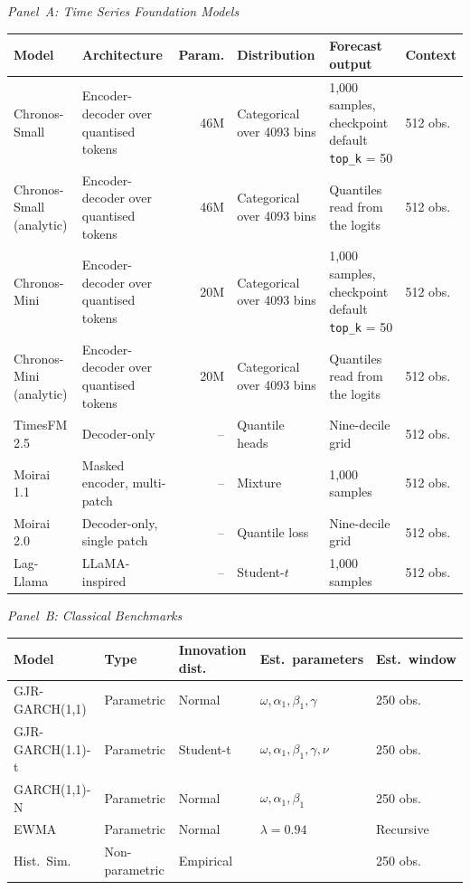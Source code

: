 \par\smallskip
\textit{Panel~A: Time Series Foundation Models}
\smallskip

\footnotesize
\begin{tabular}{@{}p{2.45cm}p{2.9cm}r p{2.5cm}p{3.2cm}l@{}}
\toprule
Model & Architecture & Param. & Distribution & Forecast output & Context \\
\midrule
Chronos-Small & Encoder-decoder over quantised tokens & 46M
& Categorical over 4093 bins & 1{,}000 samples{,} checkpoint default \texttt{top\_k} = 50
& 512 obs. \\
Chronos-Small (analytic) & Encoder-decoder over quantised tokens & 46M
& Categorical over 4093 bins & Quantiles read from the logits
& 512 obs. \\
Chronos-Mini & Encoder-decoder over quantised tokens & 20M
& Categorical over 4093 bins & 1{,}000 samples{,} checkpoint default \texttt{top\_k} = 50
& 512 obs. \\
Chronos-Mini (analytic) & Encoder-decoder over quantised tokens & 20M
& Categorical over 4093 bins & Quantiles read from the logits
& 512 obs. \\
TimesFM 2.5 & Decoder-only & --
& Quantile heads & Nine-decile grid
& 512 obs. \\
Moirai 1.1 & Masked encoder, multi-patch & --
& Mixture & 1{,}000 samples
& 512 obs. \\
Moirai 2.0 & Decoder-only, single patch & --
& Quantile loss & Nine-decile grid
& 512 obs. \\
Lag-Llama & LLaMA-inspired & --
& Student-$t$ & 1{,}000 samples
& 512 obs. \\
\bottomrule
\end{tabular}
\normalsize

\bigskip
\textit{Panel~B: Classical Benchmarks}
\smallskip

\footnotesize
\begin{tabular}{@{}p{3.0cm}p{2.2cm}p{2.2cm}p{4.0cm}l@{}}
\toprule
Model & Type & Innovation dist.\
& Est.\ parameters & Est.\ window \\
\midrule
GJR-GARCH(1,1) & Parametric & Normal
& $\omega,\alpha_1,\beta_1,\gamma$
& 250 obs. \\
GJR-GARCH(1.1)-t & Parametric & Student-t
& $\omega,\alpha_1,\beta_1,\gamma,\nu$
& 250 obs. \\
GARCH(1,1)-N & Parametric & Normal
& $\omega,\alpha_1,\beta_1$
& 250 obs. \\
EWMA & Parametric & Normal
& $\lambda = 0.94$
& Recursive \\
Hist.\ Sim. & Non-parametric & Empirical
& 
& 250 obs. \\
\bottomrule
\end{tabular}
\normalsize

